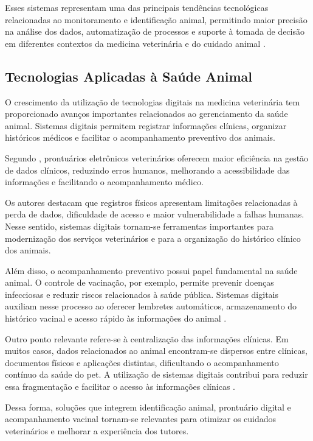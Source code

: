 \documentclass{UNESC}
\begin{document}
Esses sistemas representam uma das principais tendências tecnológicas relacionadas ao monitoramento e identificação animal, permitindo maior precisão na análise dos dados, automatização de processos e suporte à tomada de decisão em diferentes contextos da medicina veterinária e do cuidado animal \cite{vidal2021,arshad2025}.

\subsection{Tecnologias Aplicadas à Saúde Animal}

O crescimento da utilização de tecnologias digitais na medicina veterinária tem proporcionado avanços importantes relacionados ao gerenciamento da saúde animal. Sistemas digitais permitem registrar informações clínicas, organizar históricos médicos e facilitar o acompanhamento preventivo dos animais.

Segundo , prontuários eletrônicos veterinários oferecem maior eficiência na gestão de dados clínicos, reduzindo erros humanos, melhorando a acessibilidade das informações e facilitando o acompanhamento médico. 

Os autores destacam que registros físicos apresentam limitações relacionadas à perda de dados, dificuldade de acesso e maior vulnerabilidade a falhas humanas. Nesse sentido, sistemas digitais tornam-se ferramentas importantes para modernização dos serviços veterinários e para a organização do histórico clínico dos animais.

Além disso, o acompanhamento preventivo possui papel fundamental na saúde animal. O controle de vacinação, por exemplo, permite prevenir doenças infecciosas e reduzir riscos relacionados à saúde pública. Sistemas digitais auxiliam nesse processo ao oferecer lembretes automáticos, armazenamento do histórico vacinal e acesso rápido às informações do animal \cite{MOUTINHO2017,iskandar2023}.

Outro ponto relevante refere-se à centralização das informações clínicas. Em muitos casos, dados relacionados ao animal encontram-se dispersos entre clínicas, documentos físicos e aplicações distintas, dificultando o acompanhamento contínuo da saúde do pet. A utilização de sistemas digitais contribui para reduzir essa fragmentação e facilitar o acesso às informações clínicas \cite{MORAES2024,iskandar2023}.

Dessa forma, soluções que integrem identificação animal, prontuário digital e acompanhamento vacinal tornam-se relevantes para otimizar os cuidados veterinários e melhorar a experiência dos tutores.
\end{document}
